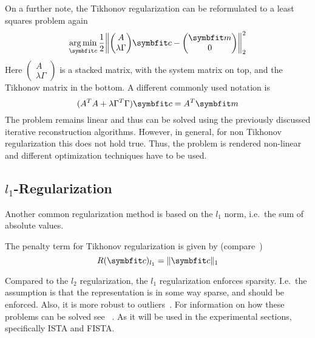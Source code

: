 On a further note, the Tikhonov regularization can be reformulated to a least squares problem again
\begin{equation}
	\argmin_{\mvec{c}} \frac{1}{2}
	\left\lVert
	\begin{pmatrix}
		A \\
		\lambda \Gamma
	\end{pmatrix}
	\mvec{c} -
	\begin{pmatrix}
		\mvec{m} \\
		0
	\end{pmatrix}
	\right\rVert_2^2
\end{equation}
Here \(\begin{pmatrix}
	A \\
	\lambda \Gamma
\end{pmatrix}\) is a stacked matrix, with the system matrix on top, and the Tikhonov matrix in the
bottom. A different commonly used notation is
\begin{equation}
	(A^T A + \lambda \Gamma^T \Gamma)\mvec{c} = A^T \mvec{m}
\end{equation}
The problem remains linear and thus can be solved using the previously discussed iterative
reconstruction algorithms. However, in general, for non Tikhonov regularization this does not hold
true. Thus, the problem is rendered non-linear and different optimization techniques have to be
used.

\subsection{\(l_1\)-Regularization}\label{subsec:l1_regularization}

Another common regularization method is based on the \(l_1\) norm, i.e.\ the sum of absolute
values.
\begin{definition}[\(l_1\)-Regularization]\label{def:l1_regularization}
	The penalty term for Tikhonov regularization is given by
        (compare~\cite{tibshirani_regression_1996,tibshirani_lasso_2013,beck_fast_2009})
	\[
		R(\mvec{c})_{l_1} = \norm{\mvec{c}}_1
	\]
\end{definition}
Compared to the \(l_2\) regularization, the \(l_1\) regularization enforces sparsity. I.e.\ the
assumption is that the representation is in some way sparse, and should be enforced. Also, it is
more robust to outliers~\cite{beck_fast_2009}. For information on how these problems can be solved
see \citeauthor{beck_fast_2009}~\cite{beck_fast_2009}. As it will be used in the experimental
sections, specifically \gls{ISTA} and  \gls{FISTA}.

